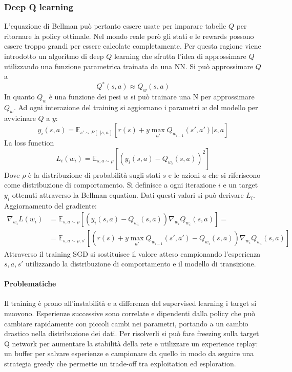 		\subsubsection{Deep Q learning}
		L'equazione di Bellman pu\`o pertanto essere usate per imparare tabelle $Q$ per ritornare la policy ottimale.
		Nel mondo reale per\`o gli stati e le rewards possono essere troppo grandi per essere calcolate completamente.
		Per questa ragione viene introdotto un algoritmo di deep $Q$ learning che sfrutta l'idea di approssimare $Q$ utilizzando una funzione parametrica trainata da una NN.
		Si pu\`o approssimare $Q$ a
		$$Q^*(s,a) \approx Q_w(s,a)$$
		In quanto $Q_w$ \`e una funzione dei pesi $w$ si pu\`o trainare una N per approssimare $Q_w$.
		Ad ogni interazione del training si aggiornano i parametri $w$ del modello per avvicinare $Q$ a $y$:
		$$y_i(s,a) = \mathbb{E}_{s'\sim P(\cdot|s,a)}[r(s)+y\max_{a'}Q_{w_{i-1}}(s',a')|s,a]$$
		La loss function
		$$L_i(w_i) = \mathbb{E}_{s,a\sim \rho}[(y_i(s,a) - Q_{w_i}(s,a))^2]$$
		Dove $\rho$ \`e la distribuzione di probabilit\`a sugli stati $s$ e le azioni $a$ che si riferiscono come distribuzione di comportamento.
		Si definisce a ogni iterazione $i$ e un target $y_i$ ottenuti attraverso la Bellman equation.
		Dati questi valori si pu\`o derivare $L_i$.
		Aggiornamento del gradiente:
		\begin{align*}
			\nabla_{w_i}L(w_i) &= \mathbb{E}_{s,a\sim\rho}[(y_i(s,a) - Q_{w_i}(s,a))\nabla_{w_i}Q_{w_i}(s,a)]=\\
								  &= \mathbb{E}_{s,a\sim\rho,s'}[(r(s) + y\max_{a'}Q_{w_{i-1}}(s',a')-Q_{w_i}(s,a))\nabla_{w_i}Q_{w_i}(s,a)]
		\end{align*}
		Attraverso il training SGD si sostituisce il valore atteso campionando l'esperienza $s,a,s'$ utilizzando la distribuzione di comportamento e il modello di transizione.

			\paragraph{Problematiche}
			Il training \`e prono all'instabilit\`a e a differenza del supervised learning i target si muovono.
			Esperienze successive sono correlate e dipendenti dalla policy che pu\`o cambiare rapidamente con piccoli cambi nei parametri, portando a un cambio drastico nella distribuzione dei dati.
			Per risolverli si pu\`o fare freezing sulla target Q network per aumentare la stabilit\`a della rete e utilizzare un experience replay: un buffer per salvare esperienze e campionare da quello in modo da seguire una strategia greedy che permette un trade-off tra exploitation ed esploration.

